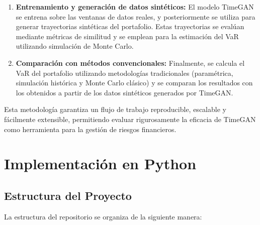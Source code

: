 \documentclass{article}
\theoremstyle{definition}
\theoremstyle{remark}
\begin{document}
\begin{enumerate}
\item \textbf{Entrenamiento y generación de datos sintéticos:} El modelo TimeGAN se entrena sobre las ventanas de datos reales, y posteriormente se utiliza para generar trayectorias sintéticas del portafolio. Estas trayectorias se evalúan mediante métricas de similitud y se emplean para la estimación del VaR utilizando simulación de Monte Carlo.
\item \textbf{Comparación con métodos convencionales:} Finalmente, se calcula el VaR del portafolio utilizando metodologías tradicionales (paramétrica, simulación histórica y Monte Carlo clásico) y se comparan los resultados con los obtenidos a partir de los datos sintéticos generados por TimeGAN.
\end{enumerate}
Esta metodología garantiza un flujo de trabajo reproducible, escalable y fácilmente extensible, permitiendo evaluar rigurosamente la eficacia de TimeGAN como herramienta para la gestión de riesgos financieros.

\section{Implementación en Python}

\subsection{Estructura del Proyecto}

La estructura del repositorio se organiza de la siguiente manera:

\renewcommand*\DTstyle{\mononokifont\small}

\newcommand{\DTcommentgreen}[1]{\textcolor{green!70!black}{\ttfamily\# #1}}
\end{document}
